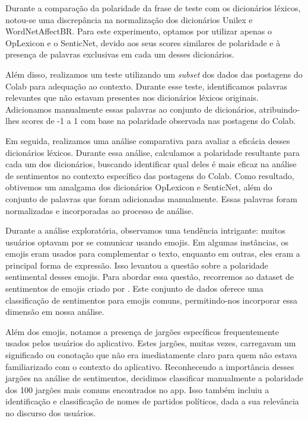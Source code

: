 Durante a comparação da polaridade da frase de teste com os dicionários léxicos, notou-se uma discrepância na normalização dos dicionários Unilex e WordNetAffectBR. Para este experimento, optamos por utilizar apenas o OpLexicon e o SenticNet, devido aos seus scores similares de polaridade e à presença de palavras exclusivas em cada um desses dicionários.

Além disso, realizamos um teste utilizando um \textit{subset} dos dados das postagens do Colab para adequação ao contexto. Durante esse teste, identificamos palavras relevantes que não estavam presentes nos dicionários léxicos originais. Adicionamos manualmente essas palavras ao conjunto de dicionários, atribuindo-lhes scores de -1 a 1 com base na polaridade observada nas postagens do Colab.

Em seguida, realizamos uma análise comparativa para avaliar a eficácia desses dicionários léxicos. Durante essa análise, calculamos a polaridade resultante para cada um dos dicionários, buscando identificar qual deles é mais eficaz na análise de sentimentos no contexto específico das postagens do Colab. Como resultado, obtivemos um amalgama dos dicionários OpLexicon e SenticNet, além do conjunto de palavras que foram adicionadas manualmente. Essas palavras foram normalizadas e incorporadas ao processo de análise.

Durante a análise exploratória, observamos uma tendência intrigante: muitos usuários optavam por se comunicar usando emojis. Em algumas instâncias, os emojis eram usados para complementar o texto, enquanto em outras, eles eram a principal forma de expressão. Isso levantou a questão sobre a polaridade sentimental desses emojis. Para abordar essa questão, recorremos ao dataset de sentimentos de emojis criado por . Este conjunto de dados oferece uma classificação de sentimentos para emojis comuns, permitindo-nos incorporar essa dimensão em nossa análise.

Além dos emojis, notamos a presença de jargões específicos frequentemente usados pelos usuários do aplicativo. Estes jargões, muitas vezes, carregavam um significado ou conotação que não era imediatamente claro para quem não estava familiarizado com o contexto do aplicativo. Reconhecendo a importância desses jargões na análise de sentimentos, decidimos classificar manualmente a polaridade dos 100 jargões mais comuns encontrados no app. Isso também incluiu a identificação e classificação de nomes de partidos políticos, dada a sua relevância no discurso dos usuários.

